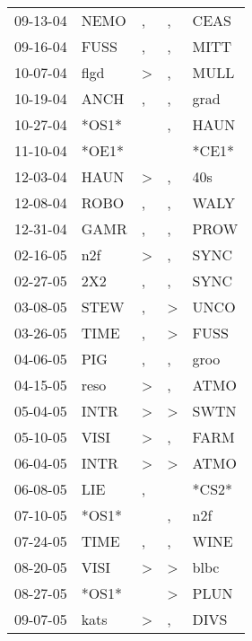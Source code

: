 \begin{supertabular}{lllll}
 09-13-04 &   NEMO &                , &                , &   CEAS \\
 09-16-04 &   FUSS &                , &                , &   MITT \\
 10-07-04 &   flgd &     \textgreater &                , &   MULL \\
 10-19-04 &   ANCH &                , &                , &   grad \\
 10-27-04 &  *OS1* &                  &                , &   HAUN \\
 11-10-04 &  *OE1* &                  &                  &  *CE1* \\
 12-03-04 &   HAUN &     \textgreater &                , &    40s \\
 12-08-04 &   ROBO &                , &                , &   WALY \\
 12-31-04 &   GAMR &                , &                , &   PROW \\
 02-16-05 &    n2f &     \textgreater &                , &   SYNC \\
 02-27-05 &    2X2 &                , &                , &   SYNC \\
 03-08-05 &   STEW &                , &     \textgreater &   UNCO \\
 03-26-05 &   TIME &                , &     \textgreater &   FUSS \\
 04-06-05 &    PIG &                , &                , &   groo \\
 04-15-05 &   reso &     \textgreater &                , &   ATMO \\
 05-04-05 &   INTR &     \textgreater &     \textgreater &   SWTN \\
 05-10-05 &   VISI &     \textgreater &                , &   FARM \\
 06-04-05 &   INTR &     \textgreater &     \textgreater &   ATMO \\
 06-08-05 &    LIE &                , &                  &  *CS2* \\
 07-10-05 &  *OS1* &                  &                , &    n2f \\
 07-24-05 &   TIME &                , &                , &   WINE \\
 08-20-05 &   VISI &     \textgreater &     \textgreater &   blbc \\
 08-27-05 &  *OS1* &                  &     \textgreater &   PLUN \\
 09-07-05 &   kats &     \textgreater &                , &   DIVS \\

\end{supertabular}
